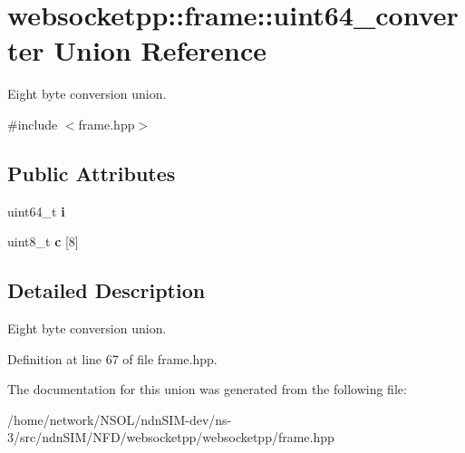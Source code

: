 \hypertarget{unionwebsocketpp_1_1frame_1_1uint64__converter}{}\section{websocketpp\+:\+:frame\+:\+:uint64\+\_\+converter Union Reference}
\label{unionwebsocketpp_1_1frame_1_1uint64__converter}


Eight byte conversion union.  




{\ttfamily \#include $<$frame.\+hpp$>$}

\subsection*{Public Attributes}
\begin{DoxyCompactItemize}
\item 
uint64\+\_\+t {\bfseries i}\hypertarget{unionwebsocketpp_1_1frame_1_1uint64__converter_a5440031a82ed910e25f6d75c59ab0a88}{}\label{unionwebsocketpp_1_1frame_1_1uint64__converter_a5440031a82ed910e25f6d75c59ab0a88}

\item 
uint8\+\_\+t {\bfseries c} \mbox{[}8\mbox{]}\hypertarget{unionwebsocketpp_1_1frame_1_1uint64__converter_a9d9e78c8c89d1eff191debf97f067731}{}\label{unionwebsocketpp_1_1frame_1_1uint64__converter_a9d9e78c8c89d1eff191debf97f067731}

\end{DoxyCompactItemize}


\subsection{Detailed Description}
Eight byte conversion union. 

Definition at line 67 of file frame.\+hpp.



The documentation for this union was generated from the following file\+:\begin{DoxyCompactItemize}
\item 
/home/network/\+N\+S\+O\+L/ndn\+S\+I\+M-\/dev/ns-\/3/src/ndn\+S\+I\+M/\+N\+F\+D/websocketpp/websocketpp/frame.\+hpp\end{DoxyCompactItemize}
